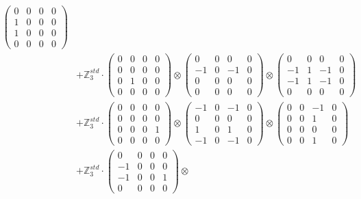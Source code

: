 \documentclass{article}
\begin{document}
{\begin{align}
            \begin{pmatrix} 0 & 0 & 0 & 0 \\ 1 & 0 & 0 & 0 \\ 1 & 0 & 0 & 0 \\ 0 & 0 & 0 & 0 \end{pmatrix} \\ 
        &+ \label{Rs16-Rc11-Solution-1-c25} \mathbb{Z}_3^{std} \cdot 
            \begin{pmatrix} 0 & 0 & 0 & 0 \\ 0 & 0 & 0 & 0 \\ 0 & 1 & 0 & 0 \\ 0 & 0 & 0 & 0 \end{pmatrix} \otimes 
            \begin{pmatrix} 0 & 0 & 0 & 0 \\ -1 & 0 & -1 & 0 \\ 0 & 0 & 0 & 0 \\ 0 & 0 & 0 & 0 \end{pmatrix} \otimes 
            \begin{pmatrix} 0 & 0 & 0 & 0 \\ -1 & 1 & -1 & 0 \\ -1 & 1 & -1 & 0 \\ 0 & 0 & 0 & 0 \end{pmatrix} \\ 
        &+ \label{Rs16-Rc11-Solution-1-c26} \mathbb{Z}_3^{std} \cdot 
            \begin{pmatrix} 0 & 0 & 0 & 0 \\ 0 & 0 & 0 & 0 \\ 0 & 0 & 0 & 1 \\ 0 & 0 & 0 & 0 \end{pmatrix} \otimes 
            \begin{pmatrix} -1 & 0 & -1 & 0 \\ 0 & 0 & 0 & 0 \\ 1 & 0 & 1 & 0 \\ -1 & 0 & -1 & 0 \end{pmatrix} \otimes 
            \begin{pmatrix} 0 & 0 & -1 & 0 \\ 0 & 0 & 1 & 0 \\ 0 & 0 & 0 & 0 \\ 0 & 0 & 1 & 0 \end{pmatrix} \\ 
        &+ \label{Rs16-Rc11-Solution-1-c27} \mathbb{Z}_3^{std} \cdot 
            \begin{pmatrix} 0 & 0 & 0 & 0 \\ -1 & 0 & 0 & 0 \\ -1 & 0 & 0 & 1 \\ 0 & 0 & 0 & 0 \end{pmatrix} \otimes 

\end{align}}
\end{document}
